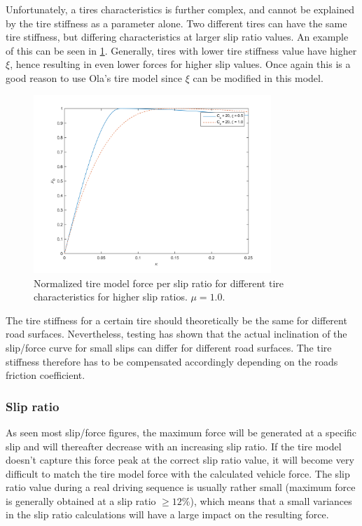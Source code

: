 Unfortunately, a tires characteristics is further complex, and cannot be explained by the tire stiffness as a parameter alone. Two different tires can have the same tire stiffness, but differing characteristics at larger slip ratio values. An example of this can be seen in \ref{different_xsi}. Generally, tires with lower tire stiffness value have higher $ \xi $, hence resulting in even lower forces for higher slip values. Once again this is a good reason to use Ola's tire model since $ \xi $ can be modified in this model.

\begin{figure}[h]
	\centering
	\includegraphics[width=0.8\textwidth]{Pictures/slipkraft_olika_xsi}
	\caption {Normalized tire model force per slip ratio for different tire characteristics for higher slip ratios.
		$ \mu = 1.0 $.}
	\label{different_xsi}
\end{figure}

The tire stiffness for a certain tire should theoretically be the same for different road surfaces. Nevertheless, testing has shown that the actual inclination of the slip/force curve for small slips can differ for different road surfaces. The tire stiffness therefore has to be compensated accordingly depending on the roads friction coefficient. 

\subsubsection{Slip ratio}
As seen most slip/force figures, the maximum force will be generated at a specific slip and will thereafter decrease with an increasing slip ratio. If the tire model doesn't capture this force peak at the correct slip ratio value, it will become very difficult to match the tire model force with the calculated vehicle force. The slip ratio value during a real driving sequence is usually rather small (maximum force is generally obtained at a slip ratio $ \geq 12 \% $), which means that a small variances in the slip ratio calculations will have a large impact on the resulting force.

